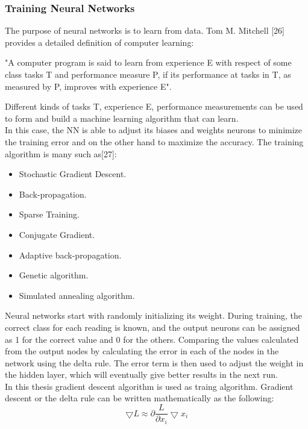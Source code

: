\subsubsection{Training Neural Networks}
\hspace{5mm} The purpose of neural networks is to learn from data. Tom M. Mitchell [26] provides a detailed definition of computer learning:
\begin{displayquote}
"A computer program is said to learn from experience E with respect of some class tasks T and performance measure P, if its performance at tasks in T, as measured by P, improves with experience E".
\end{displayquote}
\hspace{5mm} Different kinds of tasks T, experience E, performance measurements can be used to form and build a machine learning algorithm that can learn.\\
In this case, the NN is able to adjust its biases and weights neurons to minimize the training error and on the other hand to maximize the accuracy. The training algorithm is many such as[27]:
\begin{itemize}
    \item Stochastic Gradient Descent.
    \item Back-propagation.
    \item Sparse Training.
    \item Conjugate Gradient.
    \item Adaptive back-propagation.
    \item Genetic algorithm.
    \item Simulated annealing algorithm.
\end{itemize}
\hspace{5mm} Neural networks start with randomly initializing its weight. During training, the correct class for each reading is known, and the output neurons can be assigned as 1 for the correct value and 0 for the others. Comparing the values calculated from the output nodes by calculating the error in each of the nodes in the network using the delta rule. The error term is then used to adjust the weight in the hidden layer, which will eventually give better results in the next run.\\

In this thesis gradient descent algorithm is used as traing algorithm. Gradient descent or the delta rule can be written mathematically as the following:
\begin{equation}
\bigtriangledown L \approx \partial \frac{L}{\partial x_{i}}\bigtriangledown x_{i}
\end{equation}


